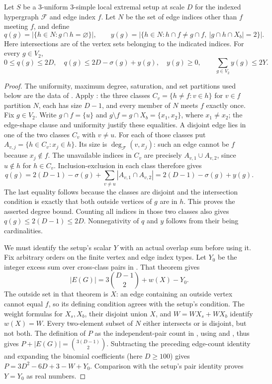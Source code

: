 \begin{lemma}
Let $S$ be a $3$-uniform $3$-simple local extremal setup at scale $D$
for the indexed hypergraph $\mathcal F$ and edge index $f$.
Let $N$ be the set of edge indices other than $f$ meeting $f$, and define
\[
q(g)=|\{h\in N:g\cap h=\varnothing\}|,\qquad
y(g)=|\{h\in N:h\cap f\ne g\cap f,\ |g\cap h\cap X_b|=2\}|.
\]
Here intersections are of the vertex sets belonging to the indicated indices.
For every $g\in V_2$,
\[
0\le q(g)\le2D,\quad q(g)\le2D-\sigma(g)+y(g),\quad y(g)\ge0,
\qquad \sum_{g\in V_2}y(g)\le2Y.
\]
\end{lemma}
\begin{proof}
The uniformity, maximum degree, saturation, and set partitions used below
are the data of .
Apply : the three classes
$C_v=\{h\ne f:v\in h\}$ for $v\in f$ partition $N$, each has size $D-1$,
and every member of $N$ meets $f$ exactly once.
Fix $g\in V_2$. Write $g\cap f=\{u\}$ and
$g\setminus f=g\cap X_b=\{x_1,x_2\}$, where $x_1\ne x_2$;
the edge-shape clause and uniformity justify these equalities.
A disjoint edge lies in one of the two classes $C_v$ with $v\ne u$.
For each of those classes put $A_{v,j}=\{h\in C_v:x_j\in h\}$.
Its size is $\deg_{\mathcal F}(v,x_j)$: such an edge cannot be $f$
because $x_j\notin f$. The unavailable indices in $C_v$ are precisely
$A_{v,1}\cup A_{v,2}$, since $u\notin h$ for $h\in C_v$.
Inclusion-exclusion in each class therefore gives
\[
q(g)=2(D-1)-\sigma(g)+\sum_{v\ne u}|A_{v,1}\cap A_{v,2}|
=2(D-1)-\sigma(g)+y(g).
\]
The last equality follows because the classes are disjoint and the
intersection condition is exactly that both outside vertices of $g$
are in $h$. This proves the asserted degree bound. Counting all indices
in those two classes also gives $q(g)\le2(D-1)\le2D$.
Nonnegativity of $q$ and $y$ follows from their being cardinalities.

We must identify the setup's scalar $Y$ with an actual overlap sum before
using it. Fix arbitrary orders on the finite vertex and edge index types.
Let $Y_0$ be the integer excess sum over cross-class pairs in
. That theorem gives
\[
|E(G)|=3\binom{D-1}{2}+w(X)-Y_0.
\]
The outside set in that theorem is $X$: an edge containing an outside
vertex cannot equal $f$, so its defining condition agrees with the
setup's condition. The weight formulas for $X_s,X_b$, their disjoint
union $X$, and $W=WX_s+WX_b$ identify $w(X)=W$.
Every two-element subset of $N$ either intersects or is disjoint, but
not both. The definition of $P$ as the independent-pair count in
, using
 and , thus gives
$P+|E(G)|=\binom{3(D-1)}2$.
Subtracting the preceding edge-count identity and expanding the binomial
coefficients (here $D\ge100$) gives
$P=3D^2-6D+3-W+Y_0$.
Comparison with the setup's pair identity proves $Y=Y_0$ as real numbers.


\end{proof}
